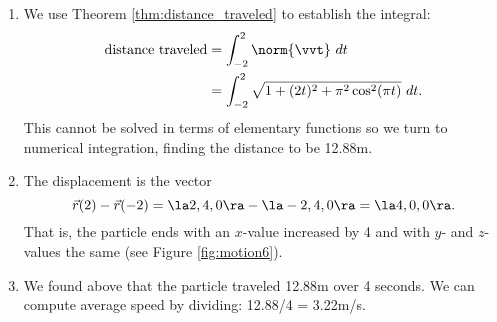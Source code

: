 \enlargethispage{2\baselineskip}
{\begin{enumerate}
	\item We use Theorem \ref{thm:distance_traveled} to establish the integral:
	\begin{align*}
	\text{distance traveled} &= \int_{-2}^2 \norm{\vvt}\ dt \\
							&= \int_{-2}^2 \sqrt{1+(2t)^2+ \pi^2\cos^2(\pi t)}\ dt.
	\end{align*}
	This cannot be solved in terms of elementary functions so we turn to numerical integration, finding the distance to be 12.88m.
	
	\item		The displacement is the vector $$\vec r(2)-\vec r(-2) = \la 2,4,0\ra - \la -2,4,0\ra = \la 4,0,0\ra.$$ That is, the particle ends with an $x$-value increased by 4 and with $y$- and $z$-values the same (see Figure \ref{fig:motion6}).
	
	\item		We found above that the particle traveled 12.88m over 4 seconds. We can compute average speed by dividing: 12.88/4 = 3.22m/s. 
	

\end{enumerate}}
